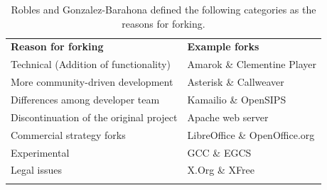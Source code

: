 \documentclass[12pt]{report}
\begin{document}
\begin{table}[!ht]
\centering
\caption[The main reasons for forking]{Robles and Gonzalez-Barahona \cite{Robles} defined the following categories as the reasons for forking.}
\label{tableReasonsForForking}
\begin{tabular}{p{} p{}}
\hline\noalign{\smallskip}
\textbf{Reason for forking} & \textbf{Example forks} \\
\noalign{\smallskip}\hline\noalign{\smallskip}
Technical (Addition of functionality) & Amarok \& Clementine Player \\ \hline
More community-driven development & Asterisk \& Callweaver \\ \hline
Differences among developer team & Kamailio \& OpenSIPS \\ \hline
Discontinuation of the original project & Apache web server \\ \hline
Commercial strategy forks & LibreOffice \& OpenOffice.org \\ \hline
Experimental & GCC \& EGCS \\ \hline
Legal issues & X.Org \& XFree\\
\noalign{\smallskip}\hline
\end{tabular}
\end{table}


\end{document}
